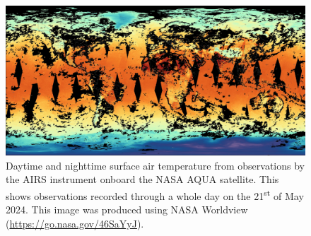 \begin{figure}[H]
    \centering
    \includegraphics[width=1.0\linewidth]{figures/snapshot_nasa_airs_aqua_2024_05_21T00_00_00Z.jpg}
    \caption{Daytime and nighttime surface air temperature from observations by the AIRS instrument onboard the NASA AQUA satellite. This shows observations recorded through a whole day on the 21\textsuperscript{st} of May 2024. This image was produced using NASA Worldview (\url{https://go.nasa.gov/46SaYyJ}).}\label{fig:satellite_image_coverage}
\end{figure}

